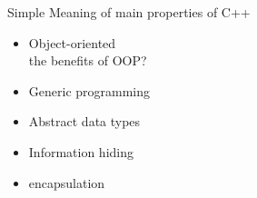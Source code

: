 \begin{section}
    {Simple Meaning of main properties of C++}


\begin{itemize}
    \item Object-oriented \\
    the benefits of OOP?
    \bigskip
    \item Generic programming
    \item Abstract data types
    \item Information hiding
    \item encapsulation
\end{itemize}

\bigskip
\end{section}
